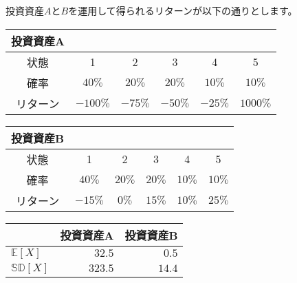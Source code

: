 \documentclass[
  letterpaper,
  pandoc,
  ja=standard,
  jafont = hiragino-pron]{ltjsbook}
\begin{document}
\begin{tcolorbox}[enhanced jigsaw, colframe=quarto-callout-tip-color-frame, breakable, rightrule=.15mm, coltitle=black, title=\textcolor{quarto-callout-tip-color}{\faLightbulb}\hspace{0.5em}{例5：資産投資}, colbacktitle=quarto-callout-tip-color!10!white, leftrule=.75mm, colback=white, left=2mm, arc=.35mm, opacityback=0, titlerule=0mm, toptitle=1mm, bottomtitle=1mm, bottomrule=.15mm, toprule=.15mm, opacitybacktitle=0.6]

投資資産\(A\)と\(B\)を運用して得られるリターンが以下の通りとします。

\begin{longtable}[]{@{}cccccc@{}}
\toprule\noalign{}
投資資産A & & & & & \\
\midrule\noalign{}
\endhead
\bottomrule\noalign{}
\endlastfoot
状態 & 1 & 2 & 3 & 4 & 5 \\
確率 & \(40\%\) & \(20\%\) & \(20\%\) & \(10\%\) & \(10\%\) \\
リターン & \(-100\%\) & \(-75\%\) & \(-50\%\) & \(-25\%\) &
\(1000\%\) \\
\end{longtable}

\begin{longtable}[]{@{}cccccc@{}}
\toprule\noalign{}
投資資産B & & & & & \\
\midrule\noalign{}
\endhead
\bottomrule\noalign{}
\endlastfoot
状態 & 1 & 2 & 3 & 4 & 5 \\
確率 & \(40\%\) & \(20\%\) & \(20\%\) & \(10\%\) & \(10\%\) \\
リターン & \(-15\%\) & \(0\%\) & \(15\%\) & \(10\%\) & \(25\%\) \\
\end{longtable}

\begin{longtable}[]{@{}lrr@{}}
\toprule\noalign{}
& 投資資産A & 投資資産B \\
\midrule\noalign{}
\endhead
\bottomrule\noalign{}
\endlastfoot
\(\mathbb{E}[X]\) & \(32.5\) & \(0.5\) \\
\(\mathbb{SD}[X]\) & \(323.5\) & \(14.4\) \\
\end{longtable}

\end{tcolorbox}
\end{document}
